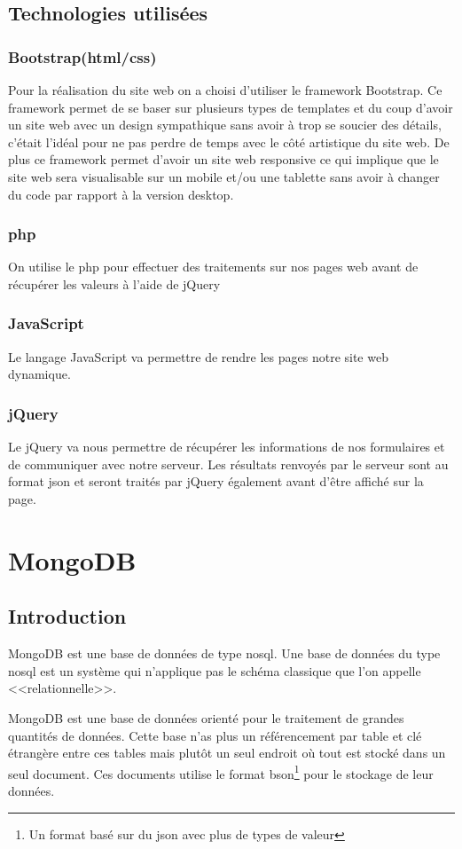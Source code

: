 \documentclass[a4paper]{scrreprt}
\begin{document}
\subsection{Technologies utilisées}
\subsubsection{Bootstrap(\gls{html}/\gls{css})}
Pour la réalisation du site web on a choisi d'utiliser le framework Bootstrap. Ce framework permet de se baser sur plusieurs types de templates et du coup d'avoir un site web avec un design sympathique sans avoir à trop se soucier des détails, c'était l'idéal pour ne pas perdre de temps avec le côté artistique du site web. De plus ce framework permet d'avoir un site web responsive ce qui implique que le site web sera visualisable sur un mobile et/ou une tablette sans avoir à changer du code par rapport à la version desktop.
\subsubsection{\gls{php}}
On utilise le \gls{php} pour effectuer des traitements sur nos pages web avant de récupérer les valeurs à l'aide de jQuery
\subsubsection{JavaScript}
Le langage JavaScript va permettre de rendre les pages notre site web dynamique.
\subsubsection{jQuery}
Le jQuery va nous permettre de récupérer les informations de nos formulaires et de communiquer avec notre serveur. Les résultats renvoyés par le serveur sont au format \gls{json} et seront traités par jQuery également avant d'être affiché sur la page.

\section{MongoDB}
\subsection{Introduction}
MongoDB est une base de données de type \gls{nosql}. Une base de données du type \gls{nosql} est un système qui n'applique pas le schéma classique que l'on appelle <<relationnelle>>.

MongoDB est une base de données orienté pour le traitement de grandes quantités de données. Cette base n'as plus un référencement par table et clé étrangère entre ces tables mais plutôt un seul endroit où tout est stocké dans un seul document. Ces documents utilise le format \gls{bson}\footnote{Un format basé sur du \gls{json} avec plus de types de valeur} pour le stockage de leur données.
\end{document}
